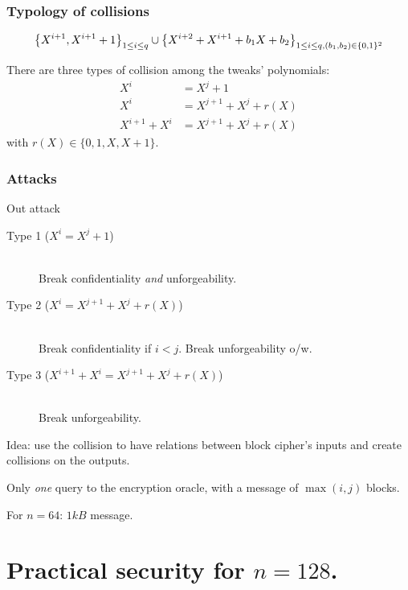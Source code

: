 \documentclass{beamer}
\begin{document}
	\begin{frame}
		\frametitle{Typology of collisions}
		
		\[
				\left\{X^{i+1}, X^{i+1} +1 \right\}_{1\leq i \leq q} \cup \left\{ X^{i+2} + X^{i+1} + b_1 X + b_2\right\}_{1\leq i \leq q, (b_1,b_2) \in \{0, 1\}^2}
		\]
		
		\vspace{0.5cm}
		There are three types of collision among the tweaks' polynomials:
		\begin{align}
			X^i &= X^j + 1 \\
			X^i & = X^{j+1} + X^j + r(X) \\
			X^{i+1} + X^i & = X^{j+1} + X^j + r(X)
		\end{align}
		with $r(X) \in \{0, 1, X, X+1\}$.
	
	\end{frame}

	\begin{frame}
		\frametitle{Attacks}

		\begin{block}{Out attack}
		\begin{description}
			\item[Type 1 ($X^i = X^j + 1$)] \ \\
			Break confidentiality \emph{and} unforgeability.   
			\item[Type 2 ($X^i  = X^{j+1} + X^j + r(X)$)] \ \\ Break confidentiality if $i < j$. Break unforgeability o/w.   
			\item[Type 3 ($X^{i+1} + X^i  = X^{j+1} + X^j + r(X)$)]  \ \\
			Break unforgeability.   
		\end{description}
		\end{block}

		Idea: use the collision to have relations between block cipher's inputs and create collisions on the outputs.
		
		Only \emph{one} query to the encryption oracle, with a message of $\max(i,j)$ blocks.
		
		For $n = 64$: $1kB$ message. 
	\end{frame}



\section{Practical security for $n = 128$.} %
\label{sec:practical_security_for_n_128}
\end{document}

